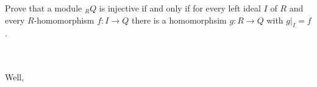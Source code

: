 Prove that a module $_RQ$ is injective if and only if for every left ideal $I$ of $R$ and every
$R$-homomorphism $f:I\to Q$ there is a homomorphsim $g:R\to Q$ with $g|_I=f$.\\\\

\begin{solution}\renewcommand{\qedsymbol}{}\ \\
    Well,
\end{solution}